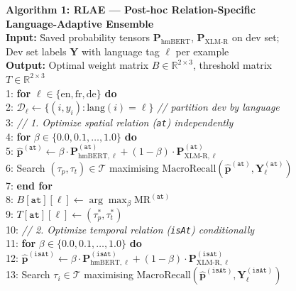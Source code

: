 \documentclass[11pt,a4paper]{article}
\begin{document}
\begin{figure}[t]
\begin{small}
\begin{tabbing}
\textbf{Algorithm 1: RLAE --- Post-hoc Relation-Specific Language-Adaptive Ensemble} \\[4pt]
\textbf{Input:} \= Saved probability tensors $\mathbf{P}_\text{hmBERT}$, $\mathbf{P}_\text{XLM-R}$ on dev set; \\
                \> Dev set labels $\mathbf{Y}$ with language tag $\ell$ per example \\
\textbf{Output:} Optimal weight matrix $B \in \mathbb{R}^{2 \times 3}$, threshold matrix $T \in \mathbb{R}^{2 \times 3}$ \\[6pt]
1: \textbf{for} $\ell \in \{\text{en}, \text{fr}, \text{de}\}$ \textbf{do} \\
2: \quad $\mathcal{D}_{\ell} \leftarrow \{(i,y_i) : \text{lang}(i) = \ell\}$ \hspace{2em} \emph{// partition dev by language} \\
3: \quad \emph{// 1. Optimize spatial relation (\texttt{at}) independently} \\
4: \quad \textbf{for} $\beta \in \{0.0, 0.1, \ldots, 1.0\}$ \textbf{do} \\
5: \quad\quad $\hat{\mathbf{p}}^{(\texttt{at})} \leftarrow \beta \cdot \mathbf{P}^{(\texttt{at})}_{\text{hmBERT},\ell} + (1-\beta)\cdot \mathbf{P}^{(\texttt{at})}_{\text{XLM-R},\ell}$ \\
6: \quad\quad Search $(\tau_p, \tau_t) \in \mathcal{T}$ maximising $\text{MacroRecall}(\hat{\mathbf{p}}^{(\texttt{at})}, \mathbf{Y}_\ell^{(\texttt{at})})$ \\
7: \quad \textbf{end for} \\
8: \quad $B[\texttt{at}][\ell] \leftarrow \arg\max_\beta \text{MR}^{(\texttt{at})}$ \\
9: \quad $T[\texttt{at}][\ell] \leftarrow (\tau_p^*, \tau_t^*)$ \\
10: \quad \emph{// 2. Optimize temporal relation (\texttt{isAt}) conditionally} \\
11: \quad \textbf{for} $\beta \in \{0.0, 0.1, \ldots, 1.0\}$ \textbf{do} \\
12: \quad\quad $\hat{\mathbf{p}}^{(\texttt{isAt})} \leftarrow \beta \cdot \mathbf{P}^{(\texttt{isAt})}_{\text{hmBERT},\ell} + (1-\beta)\cdot \mathbf{P}^{(\texttt{isAt})}_{\text{XLM-R},\ell}$ \\
13: \quad\quad Search $\tau_i \in \mathcal{T}$ maximising $\text{MacroRecall}(\hat{\mathbf{p}}^{(\texttt{isAt})}, \mathbf{Y}_\ell^{(\texttt{isAt})})$ \\

\end{tabbing}
\end{small}
\end{figure}
\end{document}

